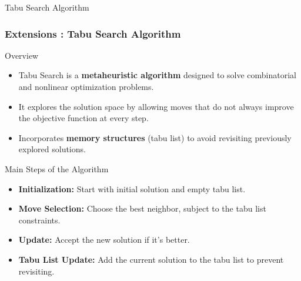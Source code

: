 \documentclass{beamer}
\begin{document}
\begin{frame}{Tabu Search Algorithm}
    \frametitle{Extensions : Tabu Search Algorithm}
    \begin{block}{Overview}
        \begin{itemize}
            \item Tabu Search is a \textbf{metaheuristic algorithm} designed to solve combinatorial and nonlinear optimization problems.
            \item It explores the solution space by allowing moves that do not always improve the objective function at every step.
            \item Incorporates \textbf{memory structures} (tabu list) to avoid revisiting previously explored solutions.
        \end{itemize}
    \end{block}
    \begin{block}{Main Steps of the Algorithm}
        \begin{itemize}
            \item \textbf{Initialization:} Start with initial solution and empty tabu list.
            \item \textbf{Move Selection:} Choose the best neighbor, subject to the tabu list constraints.
            \item \textbf{Update:} Accept the new solution if it's better.
            \item \textbf{Tabu List Update:} Add the current solution to the tabu list to prevent revisiting.
        \end{itemize}
    \end{block}
\end{frame}
\end{document}
